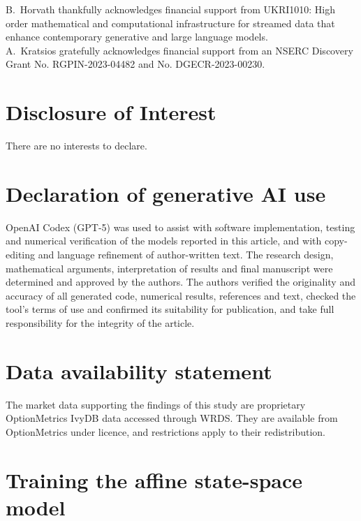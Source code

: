 \documentclass[11pt,a4paper]{article}
\begin{document}
B.~Horvath thankfully acknowledges financial support from UKRI1010: High order mathematical and
computational infrastructure for streamed data that enhance contemporary generative and large language models.\\

\noindent
A.~Kratsios gratefully acknowledges financial support from an NSERC Discovery Grant No. RGPIN-2023-04482 and No. DGECR-2023-00230.

\section*{Disclosure of Interest}

There are no interests to declare.

\section*{Declaration of generative AI use}

OpenAI Codex (GPT-5) was used to assist with software implementation,
testing and numerical verification of the models reported in this article,
and with copy-editing and language refinement of author-written text. The
research design, mathematical arguments, interpretation of results and final
manuscript were determined and approved by the authors. The authors verified
the originality and accuracy of all generated code, numerical results,
references and text, checked the tool's terms of use and confirmed its
suitability for publication, and take full responsibility for the integrity
of the article.

\section*{Data availability statement}

The market data supporting the findings of this study are proprietary
OptionMetrics IvyDB data accessed through WRDS. They are available from
OptionMetrics under licence, and restrictions apply to their redistribution.




\clearpage
\appendix

\section{Training the affine state-space model}
\label{app:affine-training}
\end{document}
